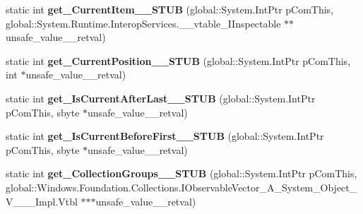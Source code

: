 \begin{DoxyCompactItemize}
\item 
\mbox{\label{struct_windows_1_1_u_i_1_1_xaml_1_1_data_1_1_i_collection_view_____impl_1_1_vtbl_af4afa9645d45bff8ce19567b19f935e6}} 
static int {\bfseries get\+\_\+\+Current\+Item\+\_\+\+\_\+\+S\+T\+UB} (global\+::\+System.\+Int\+Ptr p\+Com\+This, global\+::\+System.\+Runtime.\+Interop\+Services.\+\_\+\+\_\+vtable\+\_\+\+I\+Inspectable $\ast$$\ast$unsafe\+\_\+value\+\_\+\+\_\+retval)
\item 
\mbox{\label{struct_windows_1_1_u_i_1_1_xaml_1_1_data_1_1_i_collection_view_____impl_1_1_vtbl_af335c7717f8ae12c3241c2e5417e9d37}} 
static int {\bfseries get\+\_\+\+Current\+Position\+\_\+\+\_\+\+S\+T\+UB} (global\+::\+System.\+Int\+Ptr p\+Com\+This, int $\ast$unsafe\+\_\+value\+\_\+\+\_\+retval)
\item 
\mbox{\label{struct_windows_1_1_u_i_1_1_xaml_1_1_data_1_1_i_collection_view_____impl_1_1_vtbl_a5dfdf621c1cce5486a1833879acc6785}} 
static int {\bfseries get\+\_\+\+Is\+Current\+After\+Last\+\_\+\+\_\+\+S\+T\+UB} (global\+::\+System.\+Int\+Ptr p\+Com\+This, sbyte $\ast$unsafe\+\_\+value\+\_\+\+\_\+retval)
\item 
\mbox{\label{struct_windows_1_1_u_i_1_1_xaml_1_1_data_1_1_i_collection_view_____impl_1_1_vtbl_aec02e603fdba0583cfcf5bc039d82490}} 
static int {\bfseries get\+\_\+\+Is\+Current\+Before\+First\+\_\+\+\_\+\+S\+T\+UB} (global\+::\+System.\+Int\+Ptr p\+Com\+This, sbyte $\ast$unsafe\+\_\+value\+\_\+\+\_\+retval)
\item 
\mbox{\label{struct_windows_1_1_u_i_1_1_xaml_1_1_data_1_1_i_collection_view_____impl_1_1_vtbl_a0c0e03b6849e9f9c499aa5e1c79c40c2}} 
static int {\bfseries get\+\_\+\+Collection\+Groups\+\_\+\+\_\+\+S\+T\+UB} (global\+::\+System.\+Int\+Ptr p\+Com\+This, global\+::\+Windows.\+Foundation.\+Collections.\+I\+Observable\+Vector\+\_\+\+A\+\_\+\+System\+\_\+\+Object\+\_\+\+V\+\_\+\+\_\+\+\_\+\+Impl.\+Vtbl $\ast$$\ast$$\ast$unsafe\+\_\+value\+\_\+\+\_\+retval)
$$
\end{DoxyCompactItemize}
